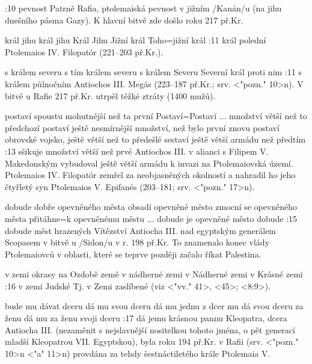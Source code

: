 :10 {pevnost} Patrně Rafia, ptolemaiská pevnost v jižním \x/Kanán/u (na jihu dnešního pásma        Gazy). K hlavní bitvě zde došlo roku 217 př.Kr.

    {král jihu}      %
    {král jihu}   %
    {Král Jihu}   %
    {Jižní král}   %
    {Toho}={jižní král}   %
:11 {král polední}  Ptolemaios IV. Filopatór (221--203 př.Kr.).
    
    {s králem severu}   %
    {s tím králem severu}   %
    {s králem Severu}   %
    {Severní král}   %
    {proti nim}   %
:11
    {s králem půlnočním}
     Antiochos III. Megás (223--187 př.Kr.; srv. <"pozn." 10>n). V bitvě u Rafie 217 př.Kr. utrpěl těžké ztráty (1400 mužů).
     
    {postaví spoustu mohutnější než ta první}   %
    {Postaví}={Postaví ... množství větší než to předchozí}   %
    {postaví ještě nesmírnější množství, než bylo první}   %
    {znovu postaví obrovské vojsko, ještě větší než to předešlé}   %
    {sestaví ještě větší armádu než předtím}   %
:13 {sšikuje množství větší než prvé}
    Antiochos III. v alianci s Filipem V. Makedonským vybudoval ještě větší armádu k invazi na Ptolemaiovská území. Ptolemaios IV. Filopatór zemřel za neobjasněných okolností a nahradil ho jeho čtyřletý syn Ptolemaios V. Epifanés (203--181; srv. <"pozn." 17>n).

    {dobude dobře opevněného města}   %
    {obsadí opevněné město}   %
    {zmocní se opevněného města}   %
    {přitáhne}={k opevněnému městu ... dobude je}   %
    {opevněné město dobude}   %
:15 {dobude měst hrazených}
    Vítězství Antiocha III. nad egyptským generálem Scopasem v bitvě u \x/Sidon/u v r. 198 př.Kr. To znamenalo konec vlády Ptolemaiovců v oblasti, které se teprve později začalo říkat Palestina.

    {v zemi okrasy}   %
    {na Ozdobě země}   %
    {v nádherné zemi}   %
    {v Nádherné zemi}   %
    {v Krásné zemi}   %
:16 {v zemi Judské}
    Tj. v Zemi zaslíbené (viz <"vv." 41>, <45>; <8:9>).

    {bude mu dávat dceru}   %
    {dá mu svou dceru}  %
    {dá mu jednu z dcer}  %
    {mu dá svou dceru za ženu}   %
    {dá mu za ženu svoji dceru}   %
:17 {dá jemu krásnou pannu}
    Kleopatra, dcera Antiocha III. (nezaměnit s nejslavnější nositelkou tohoto jména, o pět generací mladší Kleopatrou VII. Egyptskou), byla roku 194 př.Kr. v Rafii (srv. <"pozn." 10>n <"a" 11>n) provdána za tehdy šestnáctiletého krále Ptolemaia V. 
    
